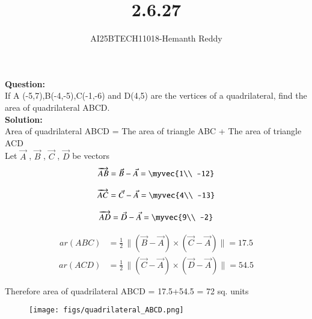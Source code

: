 \documentclass[journal]{IEEEtran}
\begin{document}

\vspace{3cm}

\title{2.6.27}
\author{AI25BTECH11018-Hemanth Reddy}
 \maketitle
{\let\newpage\relax\maketitle}

\renewcommand{\thefigure}{\theenumi}
\renewcommand{\thetable}{\theenumi}
\setlength{\intextsep}{10pt} %


\renewcommand{\thetable}{\theenumi}

\textbf{Question:}\\
If A (-5,7),B(-4,-5),C(-1,-6) and D(4,5) are the vertices of a quadrilateral, find
 the area of quadrilateral ABCD.\\
\textbf{Solution:}\\

Area of quadrilateral ABCD = The area of triangle ABC + The area of triangle ACD\\Let 
$\vec{A}$ ,
$\vec{B}$ ,
$\vec{C}$ ,
$\vec{D}$ 
be vectors\\
\begin{align}
    \overrightarrow{AB} =   \vec{B}  -  \vec{A}  =  \myvec{1\\
-12}
\end{align}

\begin{align}
    \overrightarrow{AC}  =   \vec{C}   -   \vec{A}   =  \myvec{4\\
-13}
\end{align}
 
\begin{align}
    \overrightarrow{AD}  =   \vec{D}   -   \vec{A}   =  \myvec{9\\
-2}
\end{align}

\begin{align}
ar(ABC) &= \frac{1}{2} \, \|(\vec{B} - \vec{A}) \times (\vec{C} - \vec{A}) \|  =  17.5
\end{align}
\begin{align}
ar(ACD) &= \frac{1}{2} \, \|(\vec{C} - \vec{A}) \times (\vec{D} - \vec{A}) \|  =  54.5
\end{align}

Therefore area of quadrilateral ABCD = 17.5+54.5 = 72 sq. units

\begin{figure}
    \centering
    \texttt{[image: figs/quadrilateral\_ABCD.png]}
    \caption{}
    \label{fig:placeholder}
\end{figure}
\end{document}
